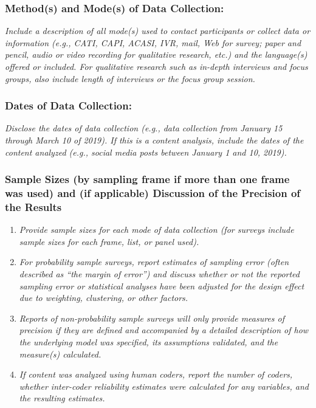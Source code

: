 \documentclass{article}
\begin{document}
\subsubsection*{Method(s) and Mode(s) of Data Collection:} \textit{Include a description of all mode(s) used to contact participants or collect data or information (e.g., CATI, CAPI, ACASI, IVR, mail, Web for survey; paper and pencil, audio or video recording for qualitative research, etc.) and the language(s) offered or included. For qualitative research such as in-depth interviews and focus groups, also include length of interviews or the focus group session.}



\subsubsection*{Dates of Data Collection:} \textit{Disclose the dates of data collection (e.g., data collection from January 15 through March 10 of 2019). If this is a content analysis, include the dates of the content analyzed (e.g., social media posts between January 1 and 10, 2019).}



\subsubsection*{Sample Sizes (by sampling frame if more than one frame was used) and (if applicable) Discussion of the Precision of the Results}

\begin{enumerate}

\item \textit{Provide sample sizes for each mode of data collection (for surveys include sample sizes for each frame, list, or panel used).}

\item \textit{For probability sample surveys, report estimates of sampling error (often described as ``the margin of error'') and discuss whether or not the reported sampling error or statistical analyses have been adjusted for the design effect due to weighting, clustering, or other factors.}

\item \textit{Reports of non-probability sample surveys will only provide measures of precision if they are defined and accompanied by a detailed description of how the underlying model was specified, its assumptions validated, and the measure(s) calculated.}

\item \textit{If content was analyzed using human coders, report the number of coders, whether inter-coder reliability estimates were calculated for any variables, and the resulting estimates.}

\end{enumerate}
\end{document}
